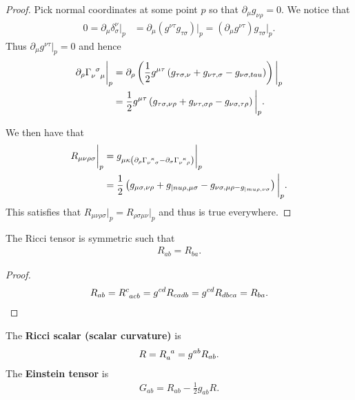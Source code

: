 \begin{proof}
    Pick normal coordinates at some point $p$ so that $\partial_\mu g_{\nu \rho} = 0$. We notice that
    \begin{align}
        0 = \partial_\mu \delta^{\nu}_\sigma \bigg|_p &= \partial_\mu \left( g^{\nu \tau}g_{\tau \sigma} \right) \bigg|_p = \left( \partial_\mu g^{\nu \tau} \right) g_{\tau \sigma} \bigg|_p
    .\end{align}
    Thus $\partial_\mu g^{\nu \tau} \bigg|_p = 0$ and hence
    \begin{align}
        \partial_\rho \tensor{\Gamma}{_\nu^{\sigma}_\mu} \bigg|_p &= \partial_\rho \left( \frac{1}{2} g^{\mu \tau} \left( g_{\tau \sigma, \nu} + g_{\nu \tau , \sigma} - g_{\nu \sigma, tau} \right)  \right) \bigg|_p \\
        &= \frac{1}{2} g^{\mu \tau} \left( g_{\tau \sigma, \nu \rho} + g_{\nu \tau, \sigma \rho} - g_{\nu \sigma, \tau \rho} \right) \bigg|_p 
    .\end{align}

    We then have that
    \begin{align}
        R_{\mu \nu \rho \sigma} \bigg|_p &= g_{\mu \kappa \left( \partial_\rho \tensor{\Gamma}{_{\nu}^{\kappa}_{\sigma}} - \partial_\sigma \tensor{\Gamma}{_{\nu}^{\kappa}_{\rho}}\right) }\bigg|_p \\
        &= \frac{1}{2} \left( g_{\mu \sigma, \nu \rho} + g_{|nu \rho , \mu \sigma} - g_{\nu \sigma, \mu \rho - g_{|mu \rho , \nu \sigma}} \right) \bigg|_p 
    .\end{align}
    This satisfies that $R_{\mu \nu \rho \sigma} \bigg|_p = R_{\rho \sigma \mu \nu} \bigg|_p$ and thus is true everywhere.

\end{proof}

\begin{corollary}
    The Ricci tensor is symmetric such that
    \begin{align}
        R_{ab} = R_{ba}
    .\end{align}
\end{corollary}

\begin{proof}
    \begin{align}
        R_{ab} = \tensor{R}{^{c}_{acb}} = g^{cd} R_{cadb} = g^{cd} R_{dbca} = R_{ba}
    .\end{align}
\end{proof}

\begin{definition}
    The \textbf{Ricci scalar (scalar curvature)} is
    \begin{align}
        R = \tensor{R}{_{a}^{a}} = g^{ab} R_{ab}
    .\end{align}
    The \textbf{Einstein tensor} is
    \begin{align}
        G_{ab} = R_{ab} -\frac{1}{2} g_{ab}R
    .\end{align}
\end{definition}

